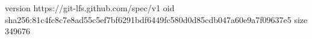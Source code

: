 version https://git-lfs.github.com/spec/v1
oid sha256:81c4fc8c7e8ad55c5ef7bf6291bdf6449fc580d0d85cdb047a60e9a7f09637e5
size 349676
